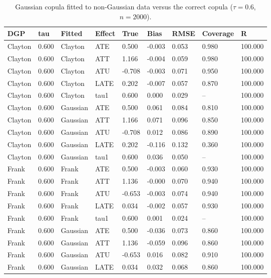 \begin{table}[htbp]\centering\small
\caption{Gaussian copula fitted to non-Gaussian data versus the correct copula ($\tau = 0.6$, $n = 2000$).}\label{tab:mc-misspec}
\begin{tabular}{lllllllll}
\hline
DGP & tau & Fitted & Effect & True & Bias & RMSE & Coverage & R
\\ \hline
Clayton & 0.600 & Clayton & ATE & 0.500 & -0.003 & 0.053 & 0.980 & 100.000 \\
Clayton & 0.600 & Clayton & ATT & 1.166 & -0.004 & 0.059 & 0.980 & 100.000 \\
Clayton & 0.600 & Clayton & ATU & -0.708 & -0.003 & 0.071 & 0.950 & 100.000 \\
Clayton & 0.600 & Clayton & LATE & 0.202 & -0.007 & 0.057 & 0.870 & 100.000 \\
Clayton & 0.600 & Clayton & tau1 & 0.600 & 0.000 & 0.029 & -- & 100.000 \\
Clayton & 0.600 & Gaussian & ATE & 0.500 & 0.061 & 0.084 & 0.810 & 100.000 \\
Clayton & 0.600 & Gaussian & ATT & 1.166 & 0.071 & 0.096 & 0.850 & 100.000 \\
Clayton & 0.600 & Gaussian & ATU & -0.708 & 0.012 & 0.086 & 0.890 & 100.000 \\
Clayton & 0.600 & Gaussian & LATE & 0.202 & -0.116 & 0.132 & 0.360 & 100.000 \\
Clayton & 0.600 & Gaussian & tau1 & 0.600 & 0.036 & 0.050 & -- & 100.000 \\
Frank & 0.600 & Frank & ATE & 0.500 & -0.003 & 0.060 & 0.930 & 100.000 \\
Frank & 0.600 & Frank & ATT & 1.136 & -0.000 & 0.070 & 0.940 & 100.000 \\
Frank & 0.600 & Frank & ATU & -0.653 & -0.003 & 0.074 & 0.940 & 100.000 \\
Frank & 0.600 & Frank & LATE & 0.034 & -0.002 & 0.057 & 0.930 & 100.000 \\
Frank & 0.600 & Frank & tau1 & 0.600 & 0.001 & 0.024 & -- & 100.000 \\
Frank & 0.600 & Gaussian & ATE & 0.500 & -0.036 & 0.073 & 0.860 & 100.000 \\
Frank & 0.600 & Gaussian & ATT & 1.136 & -0.059 & 0.096 & 0.860 & 100.000 \\
Frank & 0.600 & Gaussian & ATU & -0.653 & 0.016 & 0.082 & 0.910 & 100.000 \\
Frank & 0.600 & Gaussian & LATE & 0.034 & 0.032 & 0.068 & 0.860 & 100.000 \\

\end{tabular}
\end{table}
